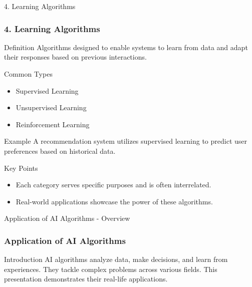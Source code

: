 \documentclass[aspectratio=169]{beamer}
\begin{document}
\begin{frame}[fragile]{4. Learning Algorithms}
    \frametitle{4. Learning Algorithms}

    \begin{block}{Definition}
    Algorithms designed to enable systems to learn from data and adapt their responses based on previous interactions.
    \end{block}
    
    \begin{block}{Common Types}
        \begin{itemize}
            \item Supervised Learning
            \item Unsupervised Learning
            \item Reinforcement Learning
        \end{itemize}
    \end{block}
    
    \begin{block}{Example}
    A recommendation system utilizes supervised learning to predict user preferences based on historical data.
    \end{block}

    \begin{block}{Key Points}
        \begin{itemize}
            \item Each category serves specific purposes and is often interrelated.
            \item Real-world applications showcase the power of these algorithms.
        \end{itemize}
    \end{block}
\end{frame}

\begin{frame}[fragile]{Application of AI Algorithms - Overview}
    \frametitle{Application of AI Algorithms}
    \begin{block}{Introduction}
    AI algorithms analyze data, make decisions, and learn from experiences. They tackle complex problems across various fields. This presentation demonstrates their real-life applications.
    \end{block}
\end{frame}
\end{document}
